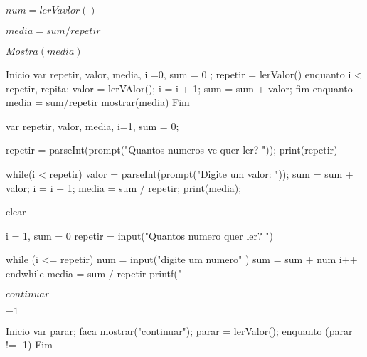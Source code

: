 \documentclass[a4paper,11pt]{article}
\def\lthtmlcheckvsize{\ifdim\ht\sizebox<\vsize 
  \ifdim\wd\sizebox<\hsize\expandafter\hfill\fi \expandafter\vfill
  \else\expandafter\vss\fi}%
\begin{document}
{\newpage\clearpage
{}%
$num = lerVavlor()$%
\lthtmlindisplaymathZ
\lthtmlcheckvsize\clearpage}

{\newpage\clearpage
{}%
$media=sum/repetir$%
\lthtmlindisplaymathZ
\lthtmlcheckvsize\clearpage}

{\newpage\clearpage
{}%
$Mostra(media)$%
\lthtmlindisplaymathZ
\lthtmlcheckvsize\clearpage}

{\newpage\clearpage
{}%
\begin{pseudocode}
Inicio
var repetir, valor, media, i =0, sum = 0 ;
repetir = lerValor()
enquanto i < repetir, repita:
  valor = lerVAlor();
  i = i + 1;
sum = sum + valor;
fim-enquanto
media = sum/repetir
mostrar(media)
Fim
\end{pseudocode}%
\lthtmlfigureZ
\lthtmlcheckvsize\clearpage}

{\newpage\clearpage
{}%
\begin{code}
var repetir, valor, media, i=1, sum = 0;
\par
repetir = parseInt(prompt("Quantos numeros vc quer ler? "));
print(repetir)
\par
while(i < repetir){
  valor = parseInt(prompt("Digite um valor: "));
  sum = sum + valor;
  i = i + 1;
}
media = sum / repetir;
print(media);
\end{code}%
\lthtmlfigureZ
\lthtmlcheckvsize\clearpage}

{\newpage\clearpage
{}%
\begin{code}
clear
\par
i = 1, sum = 0
repetir = input("Quantos numero quer ler? ")
\par
while (i <= repetir)
  num = input("digite um numero" )
  sum = sum + num
  i++
endwhile
media = sum / repetir
printf(" %
\end{code}%
\lthtmlfigureZ
\lthtmlcheckvsize\clearpage}

{\newpage\clearpage
{}%
$continuar$%
\lthtmlindisplaymathZ
\lthtmlcheckvsize\clearpage}

{\newpage\clearpage
{}%
$-1$%
\lthtmlindisplaymathZ
\lthtmlcheckvsize\clearpage}

{\newpage\clearpage
{}%
\begin{pseudocode}
Inicio
var parar;
faca
	mostrar("continuar");
	parar = lerValor();
enquanto (parar != -1)
Fim
\end{pseudocode}%
\lthtmlfigureZ
\lthtmlcheckvsize\clearpage}
\end{document}
